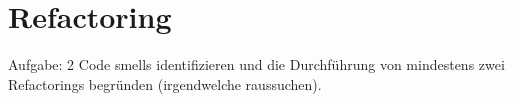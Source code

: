 \chapter{Refactoring}
Aufgabe: 2 Code smells identifizieren und die Durchführung von mindestens zwei Refactorings begründen (irgendwelche raussuchen). 